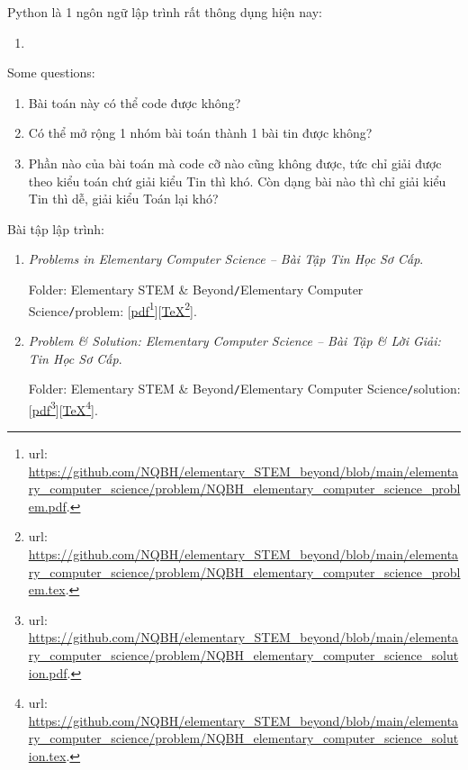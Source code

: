 \documentclass[12pt,oneside]{book}
\begin{document}
Python là 1 ngôn ngữ lập trình rất thông dụng hiện nay:

\begin{enumerate}
	\item 
\end{enumerate}


Some questions:
\begin{enumerate}
	\item Bài toán này có thể code được không?
	\item Có thể mở rộng 1 nhóm bài toán thành 1 bài tin được không?
	\item Phần nào của bài toán mà code cỡ nào cũng không được, tức chỉ giải được theo kiểu toán chứ giải kiểu Tin thì khó. Còn dạng bài nào thì chỉ giải kiểu Tin thì dễ, giải kiểu Toán lại khó?
\end{enumerate}
Bài tập lập trình:
\begin{enumerate}
	\item {\it Problems in Elementary Computer Science -- Bài Tập Tin Học Sơ Cấp}.
	
	Folder: {\sf Elementary STEM \& Beyond{\tt/}Elementary Computer Science{\tt/}problem}: [\href{https://github.com/NQBH/elementary_STEM_beyond/blob/main/elementary_computer_science/problem/NQBH_elementary_computer_science_problem.pdf}{pdf}\footnote{{\sc url}: \url{https://github.com/NQBH/elementary_STEM_beyond/blob/main/elementary_computer_science/problem/NQBH_elementary_computer_science_problem.pdf}.}][\href{https://github.com/NQBH/elementary_STEM_beyond/blob/main/elementary_computer_science/problem/NQBH_elementary_computer_science_problem.tex}{\TeX}\footnote{{\sc url}: \url{https://github.com/NQBH/elementary_STEM_beyond/blob/main/elementary_computer_science/problem/NQBH_elementary_computer_science_problem.tex}.}].
	\item {\it Problem \& Solution: Elementary Computer Science -- Bài Tập \& Lời Giải: Tin Học Sơ Cấp}.
	
	Folder: {\sf Elementary STEM \& Beyond{\tt/}Elementary Computer Science{\tt/}solution}: [\href{https://github.com/NQBH/elementary_STEM_beyond/blob/main/elementary_computer_science/problem/NQBH_elementary_computer_science_solution.pdf}{pdf}\footnote{{\sc url}: \url{https://github.com/NQBH/elementary_STEM_beyond/blob/main/elementary_computer_science/problem/NQBH_elementary_computer_science_solution.pdf}.}][\href{https://github.com/NQBH/elementary_STEM_beyond/blob/main/elementary_computer_science/problem/NQBH_elementary_computer_science_solution.tex}{\TeX}\footnote{{\sc url}: \url{https://github.com/NQBH/elementary_STEM_beyond/blob/main/elementary_computer_science/problem/NQBH_elementary_computer_science_solution.tex}.}].
\end{enumerate}
\end{document}
